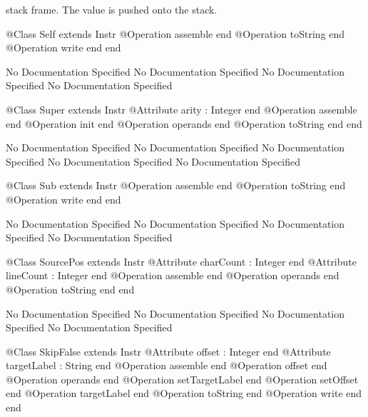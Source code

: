       stack frame. The value is pushed onto the stack.
\begin{Interface}
@Class Self extends Instr
  @Operation assemble end
  @Operation toString end
  @Operation write end
end
\end{Interface}
No Documentation Specified
No Documentation Specified
No Documentation Specified
No Documentation Specified
\begin{Interface}
@Class Super extends Instr
  @Attribute arity : Integer end
  @Operation assemble end
  @Operation init end
  @Operation operands end
  @Operation toString end
end
\end{Interface}
No Documentation Specified
No Documentation Specified
No Documentation Specified
No Documentation Specified
No Documentation Specified
\begin{Interface}
@Class Sub extends Instr
  @Operation assemble end
  @Operation toString end
  @Operation write end
end
\end{Interface}
No Documentation Specified
No Documentation Specified
No Documentation Specified
No Documentation Specified
\begin{Interface}
@Class SourcePos extends Instr
  @Attribute charCount : Integer end
  @Attribute lineCount : Integer end
  @Operation assemble end
  @Operation operands end
  @Operation toString end
end
\end{Interface}
No Documentation Specified
No Documentation Specified
No Documentation Specified
No Documentation Specified
\begin{Interface}
@Class SkipFalse extends Instr
  @Attribute offset : Integer end
  @Attribute targetLabel : String end
  @Operation assemble end
  @Operation offset end
  @Operation operands end
  @Operation setTargetLabel end
  @Operation setOffset end
  @Operation targetLabel end
  @Operation toString end
  @Operation write end
end
\end{Interface}
